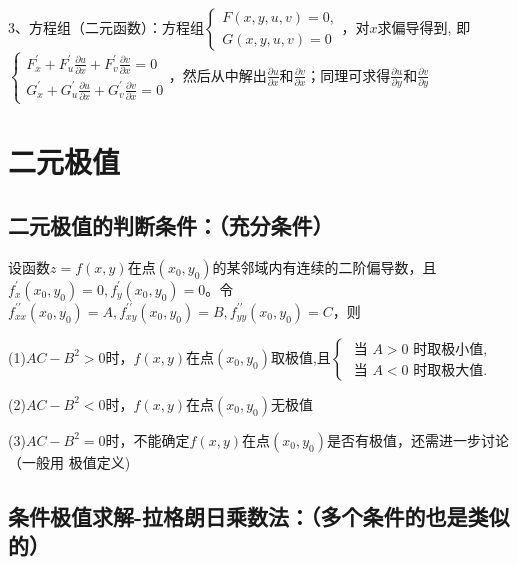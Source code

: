 3、方程组（二元函数）：方程组$\left\{\begin{array}{l}F(x, y, u, v)=0, \\ G(x, y, u, v)=0\end{array}\right.$，对$x$求偏导得到, 即$\left\{\begin{array}{l} F_{x}^{\prime}+F_{u}^{\prime} \frac{\partial u}{\partial x}+F_{v}^{\prime} \frac{\partial v}{\partial x}=0 \\ G_{x}^{\prime}+G_{u}^{\prime} \frac{\partial u}{\partial x}+G_{v}^{\prime} \frac{\partial v}{\partial x}=0 \end{array}\right.$，然后从中解出$\frac{\partial u}{\partial x}$和$\frac{\partial v}{\partial x}$；同理可求得$\frac{\partial u}{\partial y}$和$\frac{\partial v}{\partial y}$

\section{二元极值}



\subsection{二元极值的判断条件：（充分条件）}

设函数$z=f(x, y)$在点$\left(x_{0}, y_{0}\right)$的某邻域内有连续的二阶偏导数，且$f_{x}^{\prime}\left(x_{0}, y_{0}\right)=0, f_{y}^{\prime}\left(x_{0}, y_{0}\right)=0$。令$f_{x x}^{\prime \prime}\left(x_{0}, y_{0}\right)=A, f_{x y}^{\prime \prime}\left(x_{0}, y_{0}\right)=B, f_{y y}^{\prime \prime}\left(x_{0}, y_{0}\right)=C$，则

(1)$A C-B^{2}>0$时，$f(x, y)$在点$\left(x_{0}, y_{0}\right)$取极值,且$\left\{\begin{array}{l}\text { 当 } A>0 \text { 时取极小值, } \\ \text { 当 } A<0 \text { 时取极大值. }\end{array}\right.$

(2)$A C-B^{2}<0$时，$f(x, y)$在点$\left(x_{0}, y_{0}\right)$无极值

(3)$A C-B^{2}=0$时，不能确定$f(x, y)$在点$\left(x_{0}, y_{0}\right)$是否有极值，还需进一步讨论（一般用 极值定义)



\subsection{条件极值求解-拉格朗日乘数法：（多个条件的也是类似的）}

